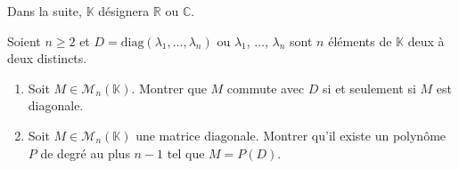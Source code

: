 \documentclass[a4paper,10pt]{report}
\begin{document}
\everymath{\displaystyle}

\begin{center}
\end{center}


\bigskip

\noindent Dans la suite, $\mathbb{K}$ désignera $\mathbb{R}$ ou $\mathbb{C}$.

\medskip

\begin{Exa} Soient $n \geq 2$ et $D= \textrm{diag}(\lambda_1, \ldots, \lambda_n)$ ou $\lambda_1$, $\ldots$, $\lambda_n$ sont $n$ éléments de $\mathbb{K}$ deux à deux distincts.
\begin{enumerate}
\item Soit $M \in \mathcal{M}_n(\mathbb{K})$. Montrer que $M$ commute avec $D$ si et seulement si $M$ est diagonale.
\item Soit $M \in \mathcal{M}_n(\mathbb{K})$ une matrice diagonale. Montrer qu'il existe un polynôme $P$ de degré au plus $n-1$ tel que $M=P(D)$.
\end{enumerate}
\end{Exa}
\end{document}
